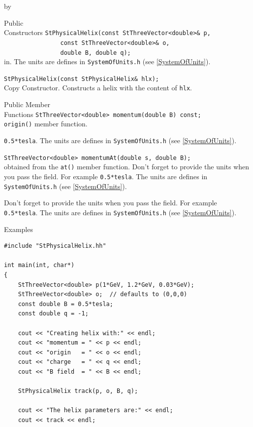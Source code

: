\documentclass[twoside]{article}
\newcommand{\comp}[1]{\texttt{#1}}%
\newcommand{\entrylabel}[1]{\mbox{\textbf{{#1}}}\hfil}%
\newenvironment{entry}
{\begin{list}{}%
    {\renewcommand{\makelabel}{\entrylabel}%
     \setlength{\labelwidth}{90pt}%
     \setlength{\leftmargin}{\labelwidth}
     \advance\leftmargin by \labelsep%
      }%
    }%
  {\end{list}}
\newcommand{\Entrylabel}[1]%
{\raisebox{0pt}[1ex][0pt]{\makebox[\labelwidth][l]%
    {\parbox[t]{\labelwidth}{\hspace{0pt}\textbf{{#1}}}}}}
\newenvironment{Entry}%
{\renewcommand{\entrylabel}{\Entrylabel}\begin{entry}}%
  {\end{entry}}
\begin{document}
\begin{description}
\begin{Entry}
\item[Public\\ Constructors]
    \verb+StPhysicalHelix(const StThreeVector<double>& p, + \\
    \verb+                const StThreeVector<double>& o, + \\
    \verb+                double B, double q);+ \\
    in. The units are defines in \texttt{SystemOfUnits.h}
    (see \ref{SystemOfUnits}).
    
    \verb+StPhysicalHelix(const StPhysicalHelix& hlx);+\\
    Copy Constructor. Constructs a helix with the content of \comp{hlx}.
            
\item[Public Member\\ Functions]
    \verb+StThreeVector<double> momentum(double B) const;+\\
    \comp{origin()} member function.
    
    \texttt{0.5*tesla}. The units are defines in \texttt{SystemOfUnits.h}
    (see \ref{SystemOfUnits}).

    \verb+StThreeVector<double> momentumAt(double s, double B);+\\
    obtained from the \comp{at()} member function.
    Don't forget to provide the units when you pass the field. For example
    \texttt{0.5*tesla}. The units are defines in \texttt{SystemOfUnits.h}
    (see \ref{SystemOfUnits}).
    
    Don't forget to provide the units when you pass the field. For example
    \texttt{0.5*tesla}. The units are defines in \texttt{SystemOfUnits.h}
    (see \ref{SystemOfUnits}).
    
\item[Examples]
{\footnotesize
\begin{verbatim}
#include "StPhysicalHelix.hh"

int main(int, char*)
{
    StThreeVector<double> p(1*GeV, 1.2*GeV, 0.03*GeV);
    StThreeVector<double> o;  // defaults to (0,0,0)
    const double B = 0.5*tesla;
    const double q = -1;

    cout << "Creating helix with:" << endl;
    cout << "momentum = " << p << endl;
    cout << "origin   = " << o << endl;
    cout << "charge   = " << q << endl;
    cout << "B field  = " << B << endl;

    StPhysicalHelix track(p, o, B, q);

    cout << "The helix parameters are:" << endl;
    cout << track << endl;
    

\end{verbatim}}
\end{Entry}
\end{description}
\end{document}

